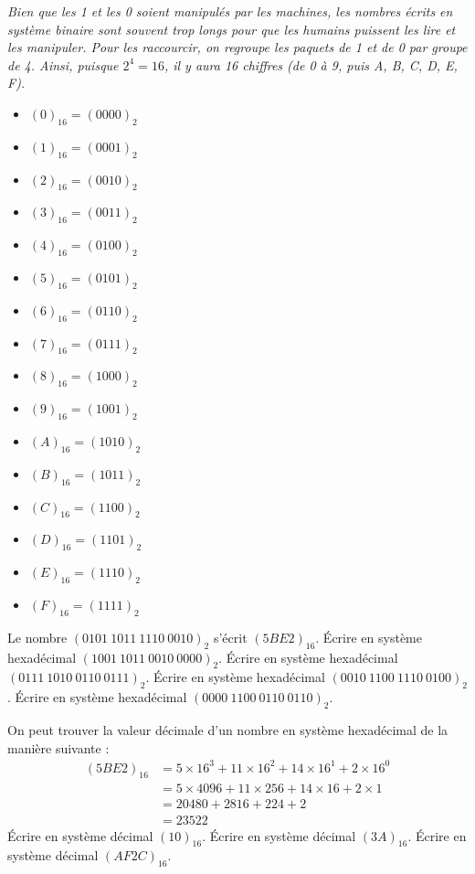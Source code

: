 \documentclass["../Cours.tex"]{subfiles}
\begin{document}
\begin{questions}

    \textit{Bien que les 1 et les 0 soient manipulés par les machines, les nombres écrits en système binaire sont souvent trop longs pour que les humains puissent les lire et les manipuler. Pour les raccourcir, on regroupe les paquets de 1 et de 0 par groupe de 4. Ainsi, puisque $2^4=16$, il y aura 16 chiffres (de 0 à 9, puis A, B, C, D, E, F).}

    \begin{multicols}{4}
        \begin{itemize}
            \item \( (0)_{16} = (0000)_2 \)
            \item \( (1)_{16} = (0001)_2 \)
            \item \( (2)_{16} = (0010)_2 \)
            \item \( (3)_{16} = (0011)_2 \)
            \item \( (4)_{16} = (0100)_2 \)
            \item \( (5)_{16} = (0101)_2 \)
            \item \( (6)_{16} = (0110)_2 \)
            \item \( (7)_{16} = (0111)_2 \)
            \item \( (8)_{16} = (1000)_2 \)
            \item \( (9)_{16} = (1001)_2 \)
            \item \( (A)_{16} = (1010)_2 \)
            \item \( (B)_{16} = (1011)_2 \)
            \item \( (C)_{16} = (1100)_2 \)
            \item \( (D)_{16} = (1101)_2 \)
            \item \( (E)_{16} = (1110)_2 \)
            \item \( (F)_{16} = (1111)_2 \)
        \end{itemize}
    \end{multicols}

    \question Le nombre $(0101~1011~1110~0010)_2$ s'écrit $(5BE2)_{16}$.
    \subquestion Écrire en système hexadécimal $(1001~1011~0010~0000)_2$.
    \subquestion Écrire en système hexadécimal $(0111~1010~0110~0111)_2$.
    \subquestion Écrire en système hexadécimal $(0010~1100~1110~0100)_2$.
    \subquestion Écrire en système hexadécimal $(0000~1100~0110~0110)_2$.

    \question On peut trouver la valeur décimale d'un nombre en système hexadécimal de la manière suivante : 
    \begin{align*}
        (5BE2)_{16} &= 5 \times 16^3 + 11 \times 16^2 + 14 \times 16^1 + 2 \times 16^0 \\
        &= 5 \times 4096 + 11 \times 256 + 14 \times 16 + 2 \times 1 \\ 
        &= 20480 + 2816 + 224 + 2 \\ 
        &= 23522
    \end{align*}
    \subquestion Écrire en système décimal $(10)_{16}$.
    \subquestion Écrire en système décimal $(3A)_{16}$.
    \subquestion Écrire en système décimal $(AF2C)_{16}$.


\end{questions}
\end{document}
